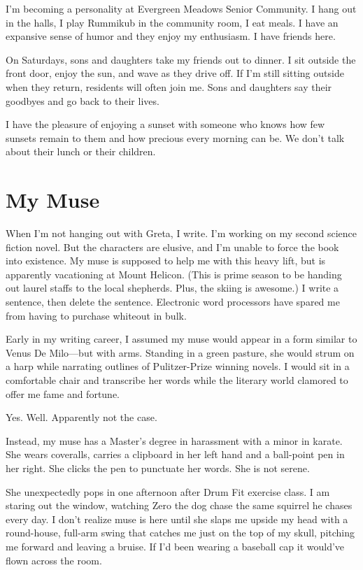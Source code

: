 \documentclass[
  letterpaper,
  DIV=11,
  numbers=noendperiod]{scrreprt}
\begin{document}
I'm becoming a personality at Evergreen Meadows Senior Community. I hang
out in the halls, I play Rummikub in the community room, I eat meals. I
have an expansive sense of humor and they enjoy my enthusiasm. I have
friends here.

On Saturdays, sons and daughters take my friends out to dinner. I sit
outside the front door, enjoy the sun, and wave as they drive off. If
I'm still sitting outside when they return, residents will often join
me. Sons and daughters say their goodbyes and go back to their lives.

I have the pleasure of enjoying a sunset with someone who knows how few
sunsets remain to them and how precious every morning can be. We don't
talk about their lunch or their children.


\chapter*{My Muse}\label{my-muse}


When I'm not hanging out with Greta, I write. I'm working on my second
science fiction novel. But the characters are elusive, and I'm unable to
force the book into existence. My muse is supposed to help me with this
heavy lift, but is apparently vacationing at Mount Helicon. (This is
prime season to be handing out laurel staffs to the local shepherds.
Plus, the skiing is awesome.) I write a sentence, then delete the
sentence. Electronic word processors have spared me from having to
purchase whiteout in bulk.

Early in my writing career, I assumed my muse would appear in a form
similar to Venus De Milo---but with arms. Standing in a green pasture,
she would strum on a harp while narrating outlines of Pulitzer-Prize
winning novels. I would sit in a comfortable chair and transcribe her
words while the literary world clamored to offer me fame and fortune.

Yes. Well. Apparently not the case.

Instead, my muse has a Master's degree in harassment with a minor in
karate. She wears coveralls, carries a clipboard in her left hand and a
ball-point pen in her right. She clicks the pen to punctuate her words.
She is not serene.

She unexpectedly pops in one afternoon after Drum Fit exercise class. I
am staring out the window, watching Zero the dog chase the same squirrel
he chases every day. I don't realize muse is here until she slaps me
upside my head with a round-house, full-arm swing that catches me just
on the top of my skull, pitching me forward and leaving a bruise. If I'd
been wearing a baseball cap it would've flown across the room.
\end{document}
